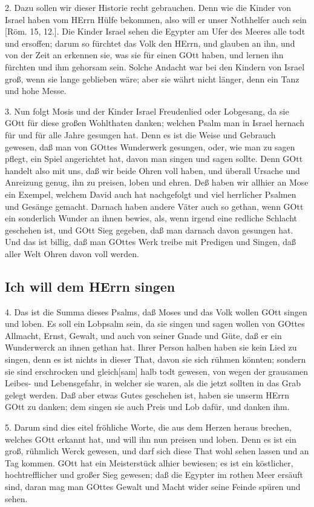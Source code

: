 2. Dazu sollen wir dieser Historie recht gebrauchen. Denn wie die Kinder von Israel haben vom HErrn Hülfe bekommen, also will er unser Nothhelfer auch sein [Röm. 15, 12.]. Die Kinder Israel sehen die Egypter am Ufer des Meeres alle todt und ersoffen; darum so fürchtet das Volk den HErrn, und glauben an ihn, und von der Zeit an erkennen sie, was sie für einen GOtt haben, und lernen ihn fürchten und ihm gehorsam sein. Solche Andacht war bei den Kindern von Israel groß, wenn sie lange geblieben wäre; aber sie währt nicht länger, denn ein Tanz und hohe Messe.

3. Nun folgt Mosis und der Kinder Israel Freudenlied oder Lobgesang, da sie GOtt für diese großen Wohlthaten danken; welchen Psalm man in Israel hernach für und für alle Jahre gesungen hat. Denn es ist die Weise und Gebrauch gewesen, daß man von GOttes Wunderwerk gesungen, oder, wie man zu sagen pflegt, ein Spiel angerichtet hat, davon man singen und sagen sollte. Denn GOtt handelt also mit uns, daß wir beide Ohren voll haben, und überall Ursache und Anreizung genug, ihn zu preisen, loben und ehren. Deß haben wir allhier an Mose ein Exempel, welchem David auch hat nachgefolgt und viel herrlicher Psalmen und Gesänge gemacht. Darnach haben andere Väter auch so gethan, wenn GOtt ein sonderlich Wunder an ihnen bewies, als, wenn irgend eine redliche Schlacht geschehen ist, und GOtt Sieg gegeben, daß man darnach davon gesungen hat. Und das ist billig, daß man GOttes Werk treibe mit Predigen und Singen, daß aller Welt Ohren davon voll werden.

\subsection{Ich will dem HErrn singen}

4. Das ist die Summa dieses Psalms, daß Moses und das Volk wollen GOtt singen und loben. Es soll ein Lobpsalm sein, da sie singen
und sagen wollen von GOttes Allmacht, Ernst, Gewalt, und auch von seiner Gnade und Güte, daß er ein Wunderwerck an ihnen gethan hat. Ihrer Person halben haben sie kein Lied zu singen, denn es ist nichts in dieser That, davon sie sich rühmen könnten; sondern sie sind erschrocken und gleich[sam] halb todt gewesen, von wegen der grausamen Leibes- und Lebensgefahr, in welcher sie waren, als die jetzt sollten in das Grab gelegt werden. Daß aber etwas Gutes geschehen ist, haben sie unserm HErrn GOtt zu danken; dem singen sie auch Preis und Lob dafür, und danken ihm.

5. Darum sind dies eitel fröhliche Worte, die aus dem Herzen heraus brechen, welches GOtt erkannt hat, und will ihn nun preisen und loben. Denn es ist ein groß, rühmlich Werck gewesen, und darf sich diese That wohl sehen lassen und an Tag kommen. GOtt hat ein Meisterstück alhier bewiesen; es ist ein köstlicher, hochtrefflicher und großer Sieg gewesen; daß die Egypter im rothen Meer ersäuft sind, daran mag man GOttes Gewalt und Macht wider seine Feinde spüren und sehen.

